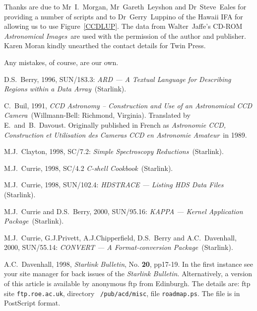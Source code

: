 \documentclass[twoside,11pt]{article}
\newcommand{\htmladdnormallink}[2]{#1}
\newcommand{\xref}[3]{#1}
\begin{document}
Thanks are due to Mr~I.~Morgan, Mr~Gareth~Leyshon and Dr~Steve~Eales for
providing a number of scripts and to Dr~Gerry~Luppino of the Hawaii IFA
for allowing us to use Figure~\ref{CCDLUP}.  The data from Walter~Jaffe's
CD-ROM {\it Astronomical Images}\, are used with the permission of the
author and publisher.  Karen Moran kindly unearthed the contact details
for Twin Press.

Any mistakes, of course, are our own.



% 


\newpage
{}
\begin{thebibliography}{99}

   D.S.~Berry, 1996, \xref{SUN/183.3}{sun183}{}: {\it
   ARD --- A Textual Language for Describing Regions within a Data Array}\,
   (Starlink).

   C.~Buil, 1991, {\it CCD Astronomy -- Construction
   and Use of an Astronomical CCD Camera}\, (Willmann-Bell: Richmond,
   Virginia).  Translated by E.~and~B.~Davoust.  Originally published
   in French as {\it Astronomie CCD, Construction et Utilisation des
   Cameras CCD en Astronomie Amateur}\, in 1989.

   M.J.~Clayton, 1998, \xref{SC/7.2}{sc7}{}: {\it Simple
   Spectroscopy Reductions}\, (Starlink).

   M.J.~Currie, 1998, \xref{SC/4.2}{sc4}{} {\it C-shell
   Cookbook}\, (Starlink).

   M.J.~Currie, 1998, \xref{SUN/102.4}{sun102}{}:
   {\it HDSTRACE --- Listing HDS Data Files}\, (Starlink).

   M.J.~Currie and D.S.~Berry, 2000,
   \xref{SUN/95.16}{sun95}{}: {\it KAPPA --- Kernel Application Package}\,
   (Starlink).

   M.J.~Currie, G.J.Privett, A.J.Chipperfield,
   D.S.~Berry and A.C.~Davenhall, 2000, \xref{SUN/55.14}{sun55}{}: {\it
   CONVERT --- A Format-conversion Package}\, (Starlink).

   A.C.~Davenhall, 1998,
  \htmladdnormallink{{\it Starlink Bulletin}}
   {http://www.starlink.ac.uk//bulletin.html},
   No. {\bf 20}, pp17-19.  In the first instance see your site manager
   for back issues of the {\it Starlink Bulletin}.  Alternatively, a
   version of this article is available by anonymous ftp from Edinburgh.
   The details are: ftp site {\tt ftp.roe.ac.uk}, directory {\tt
   /pub/acd/misc}, file {\tt roadmap.ps}.  The file is in PostScript
   format.


\end{thebibliography}
\end{document}
